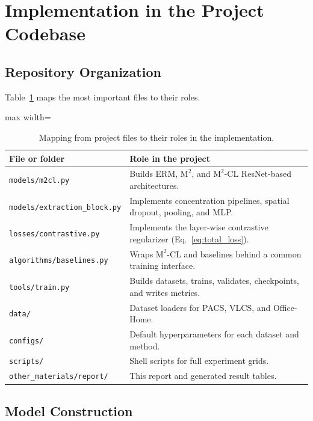 \documentclass[11pt,a4paper]{article}
\newcommand{\method}{\texorpdfstring{$\mathrm{M}^2$\textup{-CL}}{M2-CL}}
\newcommand{\base}{\texorpdfstring{$\mathrm{M}^2$}{M2}}
\newcommand{\codepath}[1]{\texttt{\small #1}}
\begin{document}
\section{Implementation in the Project Codebase}

\subsection{Repository Organization}

Table~\ref{tab:codebase_map} maps the most important files to their roles.

\begin{table}[H]
\centering
\caption{Mapping from project files to their roles in the implementation.}
\label{tab:codebase_map}
\small
\begin{adjustbox}{max width=\textwidth}
\begin{tabular}{ll}
\toprule
\rowcolor{headerblue}
File or folder & Role in the project \\
\midrule
\codepath{models/m2cl.py}          & Builds ERM, \base{}, and \method{} ResNet-based architectures. \\
\codepath{models/extraction\_block.py} & Implements concentration pipelines, spatial dropout, pooling, and MLP. \\
\codepath{losses/contrastive.py}   & Implements the layer-wise contrastive regularizer (Eq.~\ref{eq:total_loss}). \\
\codepath{algorithms/baselines.py} & Wraps \method{} and baselines behind a common training interface. \\
\codepath{tools/train.py}          & Builds datasets, trains, validates, checkpoints, and writes metrics. \\
\codepath{data/}                   & Dataset loaders for PACS, VLCS, and Office-Home. \\
\codepath{configs/}                & Default hyperparameters for each dataset and method. \\
\codepath{scripts/}                & Shell scripts for full experiment grids. \\
\codepath{other\_materials/report/} & This report and generated result tables. \\
\bottomrule
\end{tabular}
\end{adjustbox}
\end{table}

\subsection{Model Construction}
\end{document}
